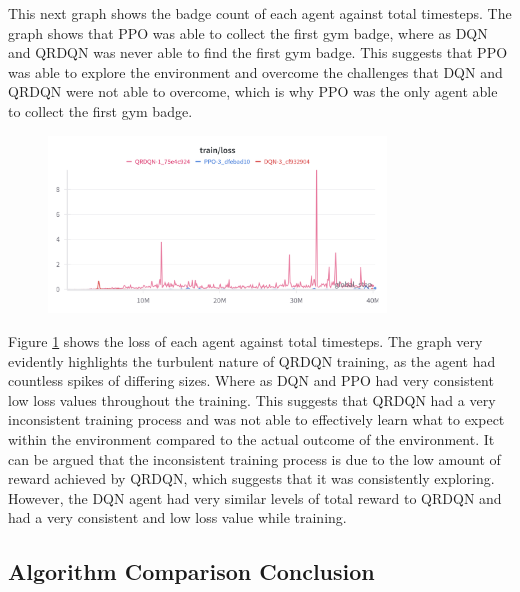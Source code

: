 This next graph shows the badge count of each agent against total timesteps. The graph shows that PPO was able to collect the first gym badge, where as DQN and QRDQN was never able to find the first gym badge. This suggests that PPO was able to explore the environment and overcome the challenges that DQN and QRDQN were not able to overcome, which is why PPO was the only agent able to collect the first gym badge. 

\begin{figure}[H]
    \centering
    \includegraphics[width=0.8\textwidth]{figures/all_step_loss.png}
    \caption{}
    \label{fig:agent_eval_all_loss}
\end{figure}

Figure \ref{fig:agent_eval_all_loss} shows the loss of each agent against total timesteps. The graph very evidently highlights the turbulent nature of QRDQN training, as the agent had countless spikes of differing sizes. Where as DQN and PPO had very consistent low loss values throughout the training. This suggests that QRDQN had a very inconsistent training process and was not able to effectively learn what to expect within the environment compared to the actual outcome of the environment. It can be argued that the inconsistent training process is due to the low amount of reward achieved by QRDQN, which suggests that it was consistently exploring. However, the DQN agent had very similar levels of total reward to QRDQN and had a very consistent and low loss value while training. 

\subsection{Algorithm Comparison Conclusion}


